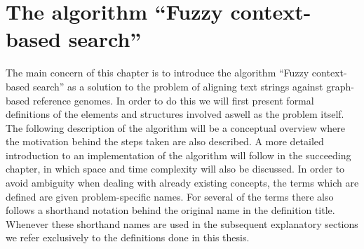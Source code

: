 \documentclass[thesis.tex]{subfiles}
\begin{document}
\chapter{The algorithm ``Fuzzy context-based search''}
{\parindent0pt
The main concern of this chapter is to introduce the algorithm ``Fuzzy context-based search'' as a solution to the problem of aligning text strings against graph-based reference genomes. In order to do this we will first present formal definitions of the elements and structures involved aswell as the problem itself. The following description of the algorithm will be a conceptual overview where the motivation behind the steps taken are also described. A more detailed introduction to an implementation of the algorithm will follow in the succeeding chapter, in which space and time complexity will also be discussed. In order to avoid ambiguity when dealing with already existing concepts, the terms which are defined are given problem-specific names. For several of the terms there also follows a shorthand notation behind the original name in the definition title. Whenever these shorthand names are used in the subsequent explanatory sections we refer exclusively to the definitions done in this thesis.
}
\end{document}

